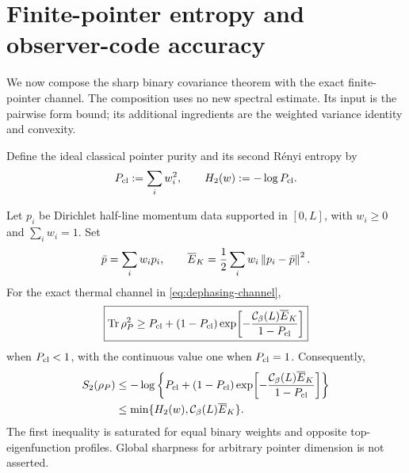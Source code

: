 \section{Finite-pointer entropy and observer-code accuracy}
\label{sec:finite-pointer}

We now compose the sharp binary covariance theorem with the exact
finite-pointer channel.  The composition uses no new spectral estimate.  Its
input is the pairwise form bound; its additional ingredients are the weighted
variance identity and convexity.

Define the ideal classical pointer purity and its second R\'enyi entropy by
\begin{equation}
 P_{\rm cl}:=\sum_iw_i^2,
 \qquad H_2(w):=-\log P_{\rm cl}.
 \label{eq:classical-pointer-purity}
\end{equation}

\begin{theorem}
\label{thm:finite-pointer-renyi}
Let $p_i$ be Dirichlet half-line momentum data supported in $[0,L]$, with
$w_i\geq0$ and $\sum_iw_i=1$.  Set
\begin{equation}
 \bar p=\sum_iw_ip_i,
 \qquad
 \overline E_{K}=\frac12\sum_iw_i\left\lVert p_i-\bar p\right\rVert^2.
 \label{eq:half-line-centered-energy}
\end{equation}
For the exact thermal channel in \cref{eq:dephasing-channel},
\begin{equation}
 \boxed{
 \operatorname{Tr}\rho_P^2\geq P_{\rm cl}+(1-P_{\rm cl})
 \exp\!\left[-\frac{\mathcal C_\beta(L)\overline E_{K}}{1-P_{\rm cl}}\right]}
 \label{eq:finite-pointer-purity-bound}
\end{equation}
when $P_{\rm cl}<1$, with the continuous value one when $P_{\rm cl}=1$.  Consequently,
\begin{align}
 S_2(\rho_P)
 &\leq-\log\left\{P_{\rm cl}+(1-P_{\rm cl})
 \exp\!\left[-\frac{\mathcal C_\beta(L)\overline E_{K}}{1-P_{\rm cl}}\right]\right\}
 \label{eq:finite-pointer-entropy-bound}\\
 &\leq\min\{H_2(w),\mathcal C_\beta(L)\overline E_{K}\}.
 \label{eq:simple-entropy-bound}
\end{align}
The first inequality is saturated for equal binary weights and opposite
top-eigenfunction profiles.  Global sharpness for arbitrary pointer dimension
is not asserted.
\end{theorem}

